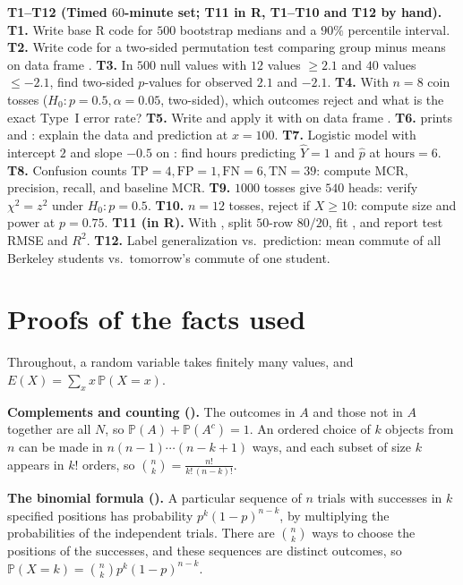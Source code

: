 \documentclass[10pt]{scrartcl}
\begin{document}
\begin{prob}
\textbf{T1--T12 (Timed $60$-minute set; T11 in R, T1--T10 and T12 by hand).}
\textbf{T1.} Write base R code for $500$ bootstrap medians and a $90\%$ percentile interval.
\textbf{T2.} Write  code for a two-sided permutation test comparing group  minus  means on data frame .
\textbf{T3.} In $500$ null values with $12$ values $\ge 2.1$ and $40$ values $\le -2.1$, find two-sided  $p$-values for observed $2.1$ and $-2.1$.
\textbf{T4.} With $n=8$ coin tosses ($H_0\colon p = 0.5, \alpha = 0.05$, two-sided), which outcomes reject and what is the exact Type~I error rate?
\textbf{T5.} Write  and apply it with  on data frame .
\textbf{T6.}  prints  and : explain the data and prediction at $x=100$.
\textbf{T7.} Logistic model with intercept $2$ and slope $-0.5$ on : find hours predicting $\hat Y=1$ and $\hat p$ at $\text{hours}=6$.
\textbf{T8.} Confusion counts $\mathrm{TP}=4, \mathrm{FP}=1, \mathrm{FN}=6, \mathrm{TN}=39$: compute MCR, precision, recall, and baseline MCR.
\textbf{T9.} $1000$ tosses give $540$ heads: verify $\chi^2 = z^2$ under $H_0\colon p=0.5$.
\textbf{T10.} $n=12$ tosses, reject if $X \ge 10$: compute size and power at $p = 0.75$.
\textbf{T11 (in R).} With , split $50$-row  $80/20$, fit , and report test RMSE and $R^2$.
\textbf{T12.} Label generalization vs.\ prediction: mean commute of all Berkeley students vs.\ tomorrow's commute of one student.
\end{prob}

\section{Proofs of the facts used}

Throughout, a random variable takes finitely many values, and $E(X) = \sum_x x\,\mathbb P(X = x)$.

\textbf{Complements and counting ().} The outcomes in $A$ and those not in $A$ together are all $N$, so $\mathbb P(A) + \mathbb P(A^c) = 1$. An ordered choice of $k$ objects from $n$ can be made in $n(n-1)\cdots(n-k+1)$ ways, and each subset of size $k$ appears in $k!$ orders, so $\binom nk = \frac{n!}{k!\,(n-k)!}$.

\textbf{The binomial formula ().} A particular sequence of $n$ trials with successes in $k$ specified positions has probability $p^k(1-p)^{n-k}$, by multiplying the probabilities of the independent trials. There are $\binom nk$ ways to choose the positions of the successes, and these sequences are distinct outcomes, so $\mathbb P(X = k) = \binom nk p^k(1-p)^{n-k}$.
\end{document}
